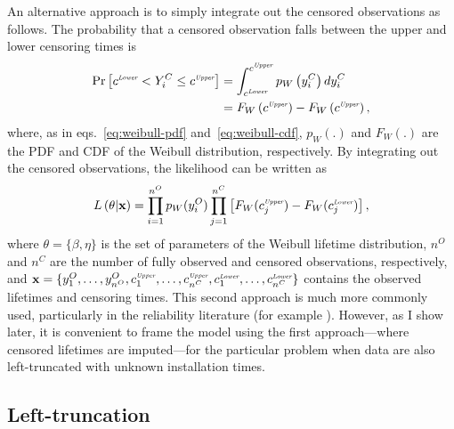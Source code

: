 An alternative approach is to simply integrate out the censored observations as follows. The probability that a censored observation falls between the upper and lower censoring times is
\begin{align*}
    \label{eq:integrate-out-cens}
    \text{Pr}\left[c^{\textit{\tiny{Lower}}} < Y^C_i \leq c^{\textit{\tiny{Upper}}}\right] & = \int_{c^{\textit{\tiny{Lower}}}}^{c^{\textit{\tiny{Upper}}}} p_W\left(y^C_i\right) d y^C_i \\
    & = F_W\left(c^{\textit{\tiny{Upper}}}\right) - F_W\left(c^{\textit{\tiny{Upper}}}\right),
\end{align*}
where, as in eqs.~\eqref{eq:weibull-pdf} and~\eqref{eq:weibull-cdf}, $p_W(.)$ and $F_W(.)$ are the PDF and CDF of the Weibull distribution, respectively. By integrating out the censored observations, the likelihood can be written as
\begin{equation}
    \label{eq:censored_likelihood}
    L\left(\theta|\textbf{x}\right) = \prod^{n^O}_{i = 1}p_W(y^O_i)
    \prod^{n^C}_{j = 1}\left[F_W(c^{\textit{\tiny{Upper}}}_j) - F_W(c^{\textit{\tiny{Lower}}}_j)\right],
\end{equation}
where $\theta = \{\beta, \eta\}$ is the set of parameters of the Weibull lifetime distribution, $n^O$ and $n^C$ are the number of fully observed and censored observations, respectively, and $\textbf{x} = \{y^O_1, 
\dots, y^O_{n^O}, c^{\textit{\tiny{Upper}}}_1, \dots, c^{\textit{\tiny{Upper}}}_{n^C}, c^{\textit{\tiny{Lower}}}_1, \dots, c^{\textit{\tiny{Lower}}}_{n^C}\}$ contains the observed lifetimes and censoring times. This second approach is much more commonly used, particularly in the reliability literature (for example \citet{Meeker2022,tian2024,hong2009,mittman2013}). However, as I show later, it is convenient to frame the model using the first approach---where censored lifetimes are imputed---for the particular problem when data are also left-truncated with unknown installation times.

\subsection{Left-truncation}

